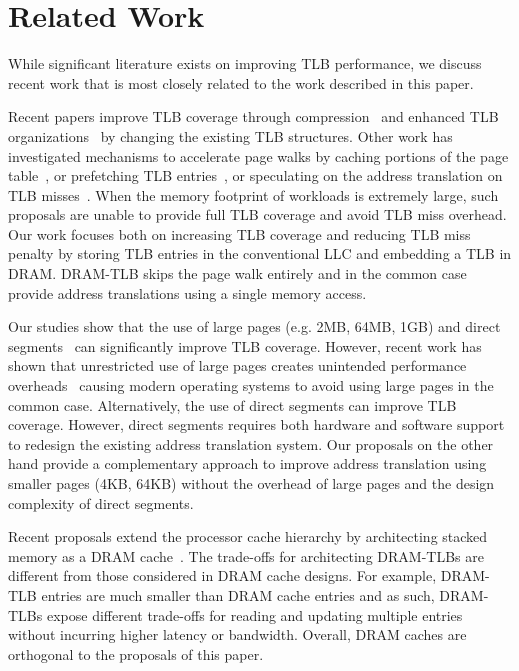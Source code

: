 \section{Related Work}

\noindent While significant literature exists on improving TLB
performance, we discuss recent work that is most closely related to
the work described in this paper.

 Recent papers improve TLB
coverage through compression~\cite{COLT, tlbreachclustering} and
enhanced TLB organizations~\cite{SharedLLT, simTLBperf} by changing
the existing TLB structures. Other work has investigated mechanisms to
accelerate page walks by caching portions of the page
table~\cite{SkipPT,MMUcaches}, or prefetching TLB
entries~\cite{prefTLBintercore, prefTLBgokul, prefTLBrecency,
power2014supporting}, or speculating on the address translation on TLB
misses~\cite{spectlb}. When the memory footprint of workloads is
extremely large, such proposals are unable to provide full TLB
coverage and avoid TLB miss overhead. Our work focuses both on
increasing TLB coverage and reducing TLB miss penalty by storing TLB
entries in the conventional LLC and embedding a TLB in DRAM. DRAM-TLB
skips the page walk entirely and in the common case provide address
translations using a single memory access.

 Our studies show
that the use of large pages (e.g. 2MB, 64MB, 1GB) and direct
segments~\cite{Basu2013} can significantly improve TLB coverage.
However, recent work has shown that unrestricted use of large pages
creates unintended performance
overheads~\cite{SuperPageProblem,TwoPageSize,numa-harmful,cameo,largepagevm}
causing modern operating systems to avoid using large pages in the
common case. Alternatively, the use of direct segments can improve TLB
coverage. However, direct segments requires both hardware and software
support to redesign the existing address translation system. Our
proposals on the other hand provide a complementary approach to
improve address translation using smaller pages (4KB, 64KB) without
the overhead of large pages and the design complexity of direct
segments. 

 Recent proposals extend
the processor cache hierarchy by architecting stacked memory as a DRAM
cache~\cite{BEAR, moin2012, unison, loh2011, jaewoong2012,
dramcache-resilient}. The trade-offs for architecting DRAM-TLBs are
different from those considered in DRAM cache designs. For example,
DRAM-TLB entries are much smaller than DRAM cache entries and as such,
DRAM-TLBs expose different trade-offs for reading and updating
multiple entries without incurring higher latency or bandwidth. 
Overall, DRAM caches are orthogonal to the proposals of
this paper.

